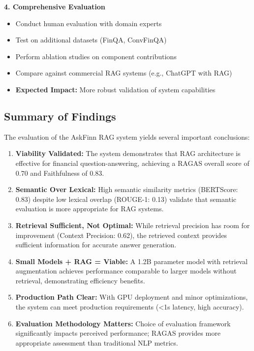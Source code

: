 \textbf{4. Comprehensive Evaluation}
\begin{itemize}
    \item Conduct human evaluation with domain experts
    \item Test on additional datasets (FinQA, ConvFinQA)
    \item Perform ablation studies on component contributions
    \item Compare against commercial RAG systems (e.g., ChatGPT with RAG)
    \item \textbf{Expected Impact:} More robust validation of system capabilities
\end{itemize}

\subsection{Summary of Findings}
\label{subsec:summary}

The evaluation of the AskFinn RAG system yields several important conclusions:

\begin{enumerate}
    \item \textbf{Viability Validated:} The system demonstrates that RAG architecture is effective for financial question-answering, achieving a RAGAS overall score of 0.70 and Faithfulness of 0.83.

    \item \textbf{Semantic Over Lexical:} High semantic similarity metrics (BERTScore: 0.83) despite low lexical overlap (ROUGE-1: 0.13) validate that semantic evaluation is more appropriate for RAG systems.

    \item \textbf{Retrieval Sufficient, Not Optimal:} While retrieval precision has room for improvement (Context Precision: 0.62), the retrieved context provides sufficient information for accurate answer generation.

    \item \textbf{Small Models + RAG = Viable:} A 1.2B parameter model with retrieval augmentation achieves performance comparable to larger models without retrieval, demonstrating efficiency benefits.

    \item \textbf{Production Path Clear:} With GPU deployment and minor optimizations, the system can meet production requirements (<1s latency, high accuracy).

    \item \textbf{Evaluation Methodology Matters:} Choice of evaluation framework significantly impacts perceived performance; RAGAS provides more appropriate assessment than traditional NLP metrics.
\end{enumerate}

